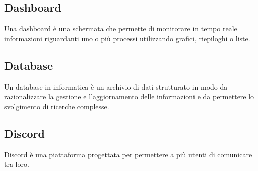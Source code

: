 
\subsection*{Dashboard}
Una dashboard è una schermata che permette di monitorare in tempo reale informazioni riguardanti uno o più processi utilizzando grafici, riepiloghi o liste. 
\subsection*{Database}
Un database in informatica è un archivio di dati strutturato in modo da razionalizzare la gestione e l'aggiornamento delle informazioni e da permettere lo svolgimento di ricerche complesse.

\subsection*{Discord}
Discord è una piattaforma progettata per permettere a più utenti di comunicare tra loro.

